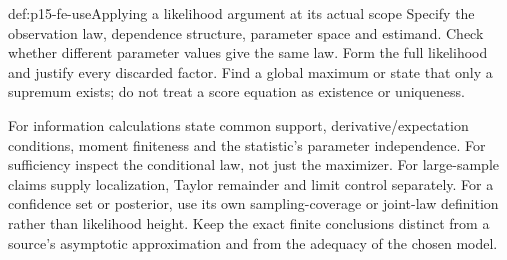 \begin{hbmethod}{def:p15-fe-use}{Applying a likelihood argument at its actual scope}
Specify the observation law, dependence structure, parameter space and
estimand. Check whether different parameter values give the same law.
Form the full likelihood and justify every discarded factor. Find a
global maximum or state that only a supremum exists; do not treat a
score equation as existence or uniqueness.

For information calculations state common support, derivative/expectation
conditions, moment finiteness and the statistic's parameter independence.
For sufficiency inspect the conditional law, not just the maximizer.
For large-sample claims supply localization, Taylor remainder and limit
control separately. For a confidence set or posterior, use its own
sampling-coverage or joint-law definition rather than likelihood height.
Keep the exact finite conclusions distinct from a source's asymptotic
approximation and from the adequacy of the chosen model.
\end{hbmethod}

